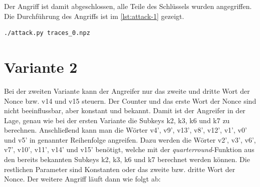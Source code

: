 \documentclass[a4paper,ngerman]{scrreprt}
\begin{document}
Der Angriff ist damit abgeschlossen, alle Teile des Schlüssels wurden
angegriffen. Die Durchführung des Angriffs ist im \autoref{lst:attack-1}
gezeigt.

\begin{lstlisting}[language=bash, caption={Angriff, Variante 1}, label=lst:attack-1]
./attack.py traces_0.npz
\end{lstlisting}


\section{Variante 2}
\label{sec:attack-2}

Bei der zweiten Variante kann der Angreifer nur das zweite und dritte Wort der
Nonce bzw. v14 und v15 steuern. Der Counter und das erste Wort der Nonce sind
nicht beeinflussbar, aber konstant und bekannt. Damit ist der Angreifer in der
Lage, genau wie bei der ersten Variante die Subkeys k2, k3, k6 und k7 zu
berechnen. Anschließend kann man die Wörter v4', v9', v13', v8', v12', v1', v0'
und v5' in genannter Reihenfolge angreifen. Dazu werden die Wörter v2', v3',
v6', v7', v10', v11', v14' und v15' benötigt, welche mit der
\emph{quarterround}-Funktion aus den bereits bekannten Subkeys k2, k3, k6 und k7
berechnet werden können. Die restlichen Parameter sind Konstanten oder das
zweite bzw. dritte Wort der Nonce. Der weitere Angriff läuft dann wie folgt ab:
\end{document}

